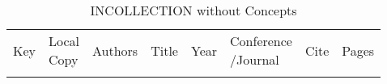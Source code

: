{\scriptsize
\begin{longtable}{llp{5cm}p{10cm}rp{3cm}lr}
\rowcolor{white}\caption{INCOLLECTION without Concepts}\\ \toprule
\rowcolor{white}Key & \shortstack{Local\\Copy} & Authors & Title & Year & \shortstack{Conference\\/Journal} & Cite & Pages\\ \midrule
\endhead
\bottomrule
\endfoot
\end{longtable}
}

